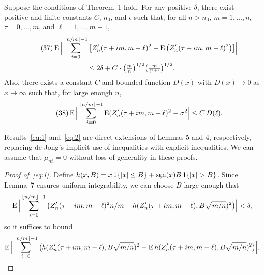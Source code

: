 \documentclass[11pt]{article}
\begin{document}
{%
\newcommand{\isum}{\sum_{i=0}^{\lfloor n/m \rfloor - 1}}
\begin{customlem}{6}
  Suppose the conditions of Theorem~1 hold.
  For any positive $\delta$, there exist positive and finite constants
  $C$, $n_0$, and $\epsilon$ such that,
  for all $n > n_0$, $m = 1,\dots,n$, $\tau = 0,\dots,m$, and $\ell =
  1,\dots,m-1$,
  \begin{multline}\label{eq:1}\tag{37}
    \E \Big\lvert \isum \big[Z_n'(\tau + i m, m - \ell)^2
    - \E \big(Z_n'(\tau + i m, m - \ell)^2\big) \big]\Big\rvert \\
    \leq 2 \delta + C \cdot \big(\tfrac{m}{n}\big)^{1/2}
    \big(\tfrac{m}{\ell^{1+\epsilon}}\big)^{1/2}.
  \end{multline}
  Also, there exists a constant $C$ and bounded function $D(x)$ with
  $D(x) \to 0$ as $x \to \infty$ such that, for large enough $n$,
  \begin{equation}
    \label{eq:2}\tag{38}
    \E \Big\lvert \isum \E(Z_n'(\tau + i m, m - \ell)^2
    - \sigma^2 \Big\rvert \leq C\, D(\ell).
  \end{equation}
\end{customlem}
\setcounter{equation}{39}
Results~\eqref{eq:1} and~\eqref{eq:2} are direct extensions of
 Lemmas 5 and 4, respectively, replacing de Jong's
implicit use of inequalities with explicit inequalities. We can assume
that $\mu_{nt} = 0$ without loss of generality in these proofs.

\begin{proof}[Proof of~\eqref{eq:1}]
  Define $h(x, B) = x \operatorname{1}\{|x| \leq B\} + \operatorname{sgn}(x) B \operatorname{1}\{|x| > B\}$.
  Since Lemma~7 ensures uniform integrability, we can choose $B$ large
  enough that
  \begin{equation*}
    \operatorname{E} \Big| \sum_{i=0}^{\lfloor n/m \rfloor - 1} \big(
    Z'_n(\tau + im, m-\ell)^2 n / m -
    h(Z'_n(\tau + im, m-\ell), B \sqrt{m/n})^2\big)\Big| < \delta,
  \end{equation*}
  so it suffices to bound
  \begin{equation*}
    \operatorname{E} \Big| \sum_{i=0}^{\lfloor n/m \rfloor - 1}
    \big(h(Z'_n(\tau + im, m-\ell), B \sqrt{m/n})^2 -
    \operatorname{E} h(Z'_n(\tau + im, m-\ell), B \sqrt{m/n})^2\big)\Big|.
  \end{equation*}


\end{proof}}
\end{document}
